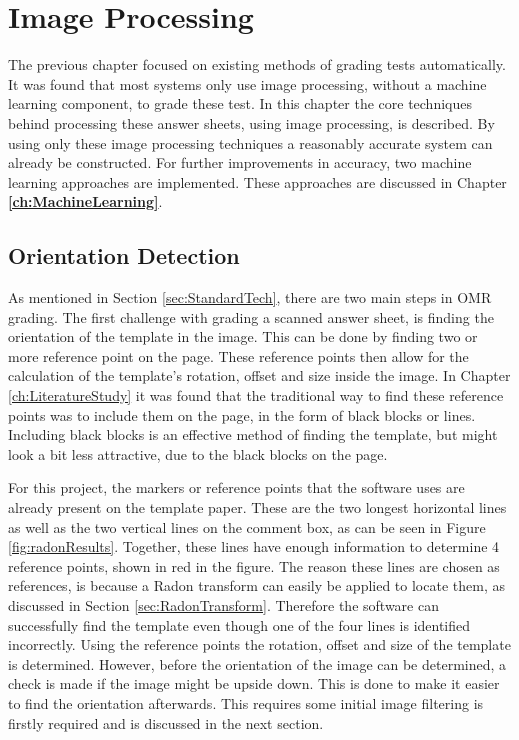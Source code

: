 \chapter{Image Processing}
\label{ch:ImageProcessing}
\graphicspath{{Chapter3/Chapter3Figures/}}
The previous chapter focused on existing methods of grading tests automatically. It was found that most systems only use image processing, without a machine learning component, to grade these test. In this chapter the core techniques behind processing these answer sheets, using image processing, is described. By using only these image processing techniques a reasonably accurate system can already be constructed. For further improvements in accuracy, two machine learning approaches are implemented. These approaches are discussed in Chapter \textbf{\ref{ch:MachineLearning}}.

\section{Orientation Detection}
\label{sec:orientDetect}
As mentioned in Section \ref{sec:StandardTech}, there are two main steps in OMR grading. The first challenge with grading a scanned answer sheet, is finding the orientation of the template in the image. This can be done by finding two or more reference point on the page. These reference points then allow for the calculation of the template's rotation, offset and size inside the image. In Chapter \ref{ch:LiteratureStudy} it was found that the traditional way to find these reference points was to include them on the page, in the form of black blocks or lines. Including black blocks is an effective method of finding the template, but might look a bit less attractive, due to the black blocks on the page.

For this project, the markers or reference points that the software uses are already present on the template paper. These are the two longest horizontal lines as well as the two vertical lines on the comment box, as can be seen in Figure \ref{fig:radonResults}. Together, these lines have enough information to determine 4 reference points, shown in red in the figure. The reason these lines are chosen as references, is because a Radon transform can easily be applied to locate them, as discussed in Section \ref{sec:RadonTransform}. Therefore the software can successfully find the template even though one of the four lines is identified incorrectly. Using the reference points the rotation, offset and size of the template is determined. However, before the orientation of the image can be determined, a check is made if the image might be upside down. This is done to make it easier to find the orientation afterwards. This requires some initial image filtering is firstly required and is discussed in the next section.

